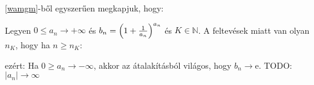 \ref{wamgm}-ből egyszerűen megkapjuk, hogy:

Legyen $0\le a_n \to +\infty$ és $b_n={ \left( 1+\frac{1}{a_n} \right) }^{a_n}$ és $K\in\mathbb{N}$. 
A feltevések miatt van olyan $n_K$, hogy ha $n\ge n_K$:

ezért:
Ha $0\ge a_n \to -\infty$, akkor az
átalakításból világos, hogy $b_n\to \mathrm{e}$.
\newline 
TODO: $|a_n|\to \infty$
